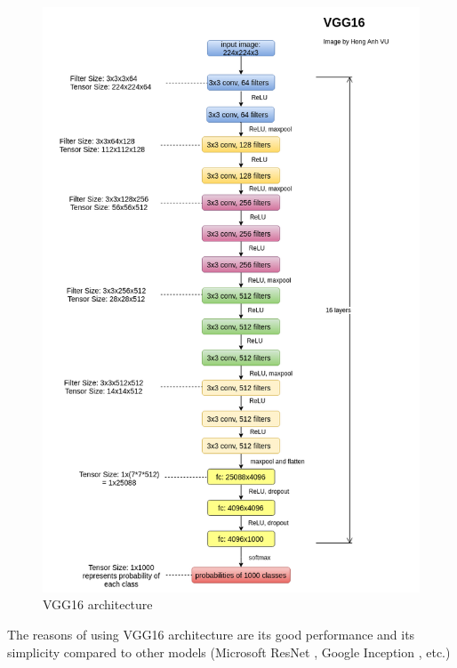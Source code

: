 \begin{figure}[tb]
	\centering
	\includegraphics[width=0.9\hsize]{./figures/originalVgg16}
	\caption{VGG16 architecture}
	\label{fig:originalVgg16}
\end{figure}

The reasons of using VGG16 architecture are its good performance and its simplicity compared to other models (Microsoft ResNet \cite{DBLP:journals/corr/HeZRS15}, Google Inception \cite{DBLP:journals/corr/SzegedyVISW15}, etc.)